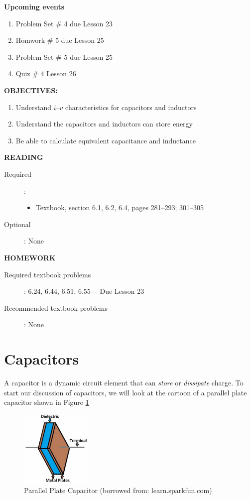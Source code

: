 \documentclass{handout}
\begin{document}
\maketitle

\textbf{Upcoming events}
\begin{enumerate}
\item Problem Set \# 4 due Lesson 23
\item Homwork \# 5 due Lesson 25
\item Problem Set \# 5 due Lesson 25
\item Quiz \# 4 Lesson 26
\end{enumerate}

\textbf{OBJECTIVES:}
\begin{enumerate}
\item Understand $i$--$v$ characteristics for capacitors and inductors
\item Understand the capacitors and inductors can store energy
\item Be able to calculate equivalent capacitance and inductance
\end{enumerate}

\textbf{READING}
\begin{description}
\item [Required]:
\begin{itemize}
\item  Textbook, section 6.1, 6.2, 6.4, pages 281--293; 301--305
\end{itemize}
\item [Optional]: None
\end{description}

\textbf{HOMEWORK}
\begin{description}
\item [Required textbook problems]: 6.24, 6.44, 6.51, 6.55--- Due Lesson 23
\item [Recommended textbook problems]: None
\end{description}

\section{Capacitors}
A capacitor is a dynamic circuit element that can {\em store} or {\em dissipate} charge.  To start our discussion of capacitors, we will look at the cartoon of a parallel plate capacitor shown in Figure \ref{fig: Capacitor}

\begin{figure} [h!]
\centering
\includegraphics[width=0.3\textwidth]{Capacitor.jpg}
\caption{Parallel Plate Capacitor (borrowed from: learn.sparkfun.com)}
\label{fig: Capacitor}
\end{figure}
\end{document}
